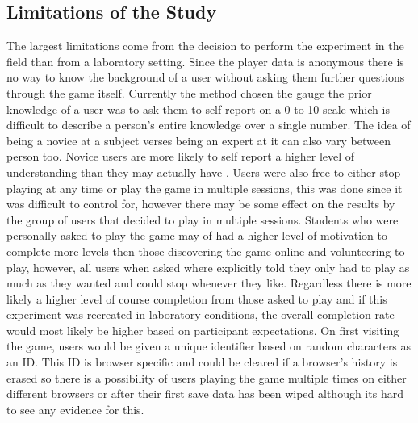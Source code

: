 \documentclass[letterpaper,man,natbib,floatsintext]{apa7}  %
\begin{document}
\subsection{Limitations of the Study}
The largest limitations come from the decision to perform the experiment in the field than from a laboratory setting. Since the player data is anonymous there is no way to know the background of a user without asking them further questions through the game itself. Currently the method chosen the gauge the prior knowledge of a user was to ask them to self report on a 0 to 10 scale which is difficult to describe a person's entire knowledge over a single number. The idea of being a novice at a subject verses being an expert at it can also vary between person too. Novice users are more likely to self report a higher level of understanding than they may actually have \cite{kruger1999unskilled}. Users were also free to either stop playing at any time or play the game in multiple sessions, this was done since it was difficult to control for, however there may be some effect on the results by the group of users that decided to play in multiple sessions. Students who were personally asked to play the game may of had a higher level of motivation to complete more levels then those discovering the game online and volunteering to play, however, all users when asked where explicitly 
told they only had to play as much as they wanted and could stop whenever they like. Regardless there is more likely a higher level of course completion from those asked to play and if this experiment was recreated in laboratory conditions, the overall completion rate would most likely be higher based on participant expectations. On first visiting the game, 
users would be given a unique identifier based on random characters as an ID. This ID is browser specific and could be cleared if a browser's history is erased so there is a possibility of users playing the game multiple times on either different browsers or after their first save data has been wiped although its hard to see any evidence for this.
\end{document}

